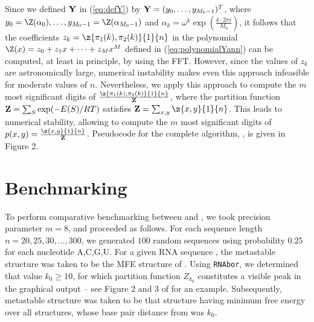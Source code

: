 Since we defined $\bf Y$ in (\ref{eq:defY}) by ${\bf Y} =
(y_0,\ldots,y_{M_0-1})^T$, where
$y_0=\Z(\alpha_0),\ldots, y_{M_0-1}=\Z(\alpha_{M_0-1})$ and $\alpha_k = \omega^k
\exp(\frac{k \cdot 2\pi i}{M_0})$,
it follows that the coefficients
$z_k=\z{\pi_1(k),\pi_2(k)}{1}{n}$ in the polynomial
$\Z(x) = z_0 + z_1 x + \cdots + z_{M} x^{M}$ defined in
(\ref{eq:polynomialYann}) can be computed, at least in principle,
by using the FFT. However, since the values of
$z_{k}$ are astronomically large, numerical
instability makes even this approach infeasible for moderate values of $n$.
Nevertheless, we apply this approach to compute the $m$ most significant
digits of $\frac{\z{\pi_1(k),\pi_2(k)}{1}{n}}{{\bf Z}}$,
where the partition function ${\bf Z} = \sum_{S} \exp(-E(S)/RT)$ satisfies
${{\bf Z}} = \sum_{x,y} \z{x,y}{1}{n}$. This leads to numerical stability,
allowing \ffttwo to compute the
$m$ most significant digits of $p(x,y) = \frac{\z{x,y}{1}{n}}{{\bf Z}}$.
Pseudocode for the complete algorithm, \fftbor, is given in
Figure 2.


\section{Benchmarking}
\label{section:benchmarking}

To perform comparative benchmarking between \rnatwofold and \ffttwo,
we took precision parameter $m=8$, and proceeded as follows.
For each sequence length $n = 20,25,30,\ldots,300$, we generated
$100$ random sequences using probability $0.25$ for each nucleotide A,C,G,U.
For a given RNA sequence \seq, the metastable structure \strA was
taken to be the MFE structure of \seq.
Using {\tt RNAbor}, we determined that value $k_0\geq 10$, for which
partition function $Z_{k_0}$ constitutes a visible peak in the graphical
output -- see Figure 2 and 3 of  \cite{Freyhult.b07} for an example.
Subsequently, metastable structure \strB was taken to be that structure
having minimum free energy over all structures, whose base pair distance from
\strA was $k_0$.

